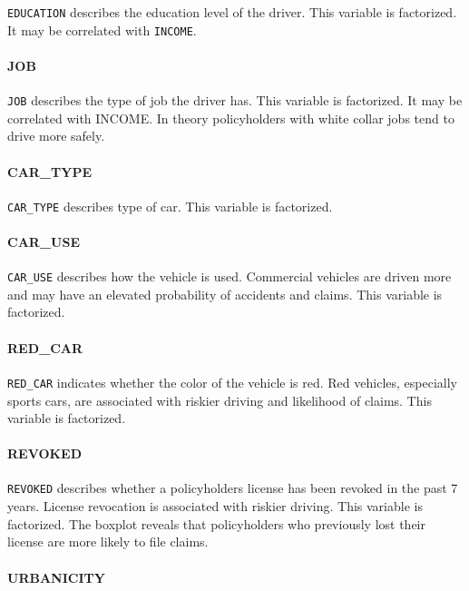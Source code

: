\documentclass[]{article}
\let\oldparagraph\paragraph
\renewcommand{\paragraph}[1]{\oldparagraph{#1}\mbox{}}
\begin{document}
\texttt{EDUCATION} describes the education level of the driver. This
variable is factorized. It may be correlated with \texttt{INCOME}.

\paragraph{JOB}\label{job}

\texttt{JOB} describes the type of job the driver has. This variable is
factorized. It may be correlated with INCOME. In theory policyholders
with white collar jobs tend to drive more safely.

\paragraph{CAR\_TYPE}\label{car_type}

\texttt{CAR\_TYPE} describes type of car. This variable is factorized.

\paragraph{CAR\_USE}\label{car_use}

\texttt{CAR\_USE} describes how the vehicle is used. Commercial vehicles
are driven more and may have an elevated probability of accidents and
claims. This variable is factorized.

\paragraph{RED\_CAR}\label{red_car}

\texttt{RED\_CAR} indicates whether the color of the vehicle is red. Red
vehicles, especially sports cars, are associated with riskier driving
and likelihood of claims. This variable is factorized.

\paragraph{REVOKED}\label{revoked}

\texttt{REVOKED} describes whether a policyholders license has been
revoked in the past 7 years. License revocation is associated with
riskier driving. This variable is factorized. The boxplot reveals that
policyholders who previously lost their license are more likely to file
claims.

\paragraph{URBANICITY}\label{urbanicity}
\end{document}
